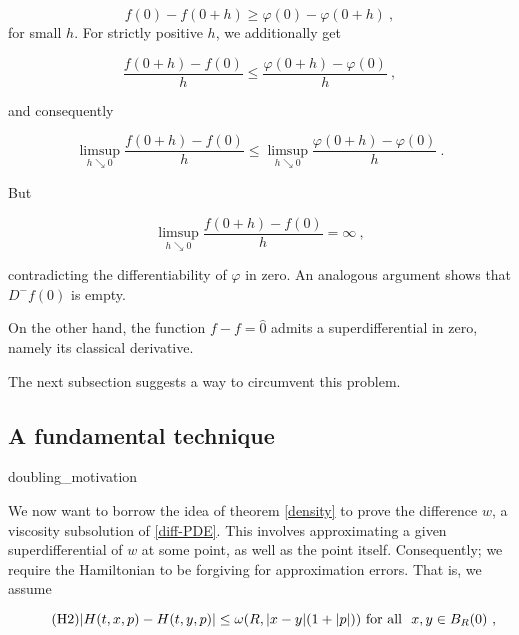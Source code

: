 		\begin{equation*}
			f(0) - f(0 + h) \geq \varphi(0) - \varphi(0 + h)  \ ,
		\end{equation*}
		for small $ h $. For strictly positive $ h $, we additionally get
		
		\begin{equation*}
			\frac{f( 0 + h) - f(0)}{h} \leq \frac{\varphi(0 + h) - \varphi(0)}{h} \ ,
		\end{equation*}
		
		and consequently 
		
		\begin{equation*}
			\limsup\limits_{h \searrow 0} \frac{f( 0 + h) - f(0)}{h} \leq \limsup\limits_{h \searrow 0} \frac{\varphi(0 + h) - \varphi(0)}{h} \ .
		\end{equation*}
		
		But 
		
		\begin{equation*}
			\limsup\limits_{h \searrow 0} \frac{f( 0 + h) - f(0)}{h} = \infty \ ,
		\end{equation*}
		
		contradicting the differentiability of $ \varphi $ in zero. An analogous argument shows that $ D^{-}f(0) $ is empty.
		
		On the other hand, the function $ f - f = \hat{0} $ admits a superdifferential in zero, namely its classical derivative.
		
		The next subsection suggests a way to circumvent this problem.
		
	\subsection{A fundamental technique}
	
		 {doubling_motivation}
		 
		 We now want to borrow the idea of theorem \ref{density} to prove the difference $ w $, a viscosity subsolution of \eqref{diff-PDE}. This involves approximating a given superdifferential of $ w $ at some point, as well as the point itself. Consequently; we require the Hamiltonian to be forgiving for approximation errors. That is, we assume
		 
		 \begin{equation}
		 \tag{H2}
		 \lvert H(t, x, p) - H(t, y, p) \rvert \leq \omega(R, \lvert x - y \rvert (1 + \lvert p \rvert)) \hbox{ for all } \ x, y \in B_R(0) \ ,
		 \label{eqn:H2}
		 \end{equation}
		 

